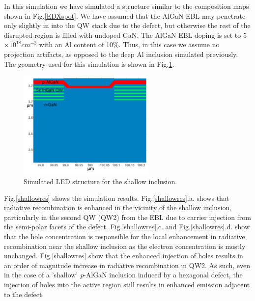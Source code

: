 In this simulation we have simulated a structure similar to the composition maps shown in Fig.\ref{EDXspot}. We have assumed that the AlGaN EBL may penetrate only slightly in into the QW stack due to the defect, but otherwise the rest of the disrupted region is filled with undoped GaN. The AlGaN EBL doping is set to 5$\times 10^{18} cm^{-3}$ with an Al content of 10$\%$. Thus, in this case we assume no projection artifacts, as opposed to the deep Al inclusion simulated previously. The geometry used for this simulation is shown in Fig.\ref{shallowgeom}.

\begin{figure}[h]
	\centering
	\includegraphics[width=0.6\textwidth]{Figs/Ch3/shallow}
	\caption[h] {Simulated LED structure for the shallow inclusion.}
	\label{shallowgeom}
\end{figure}
\FloatBarrier 

Fig.\ref{shallowres} shows the simulation results. Fig.\ref{shallowres}.a. shows that radiative recombination is enhanced in the vicinity of the shallow inclusion, particularly in the second QW (QW2) from the EBL due to carrier injection from the semi-polar facets of the defect. Fig.\ref{shallowres}.c. and Fig.\ref{shallowres}.d. show that the hole concentration is responsible for the local enhancement in radiative recombination near the shallow inclusion as the electron concentration is mostly unchanged. Fig.\ref{shallowres} show that the enhanced injection of holes results in an order of magnitude increase in radiative recombination in QW2. As such, even in the case of a 'shallow' \textit{p}-AlGaN inclusion induced by a hexagonal defect, the injection of holes into the active region still results in enhanced emission adjacent to the defect.

